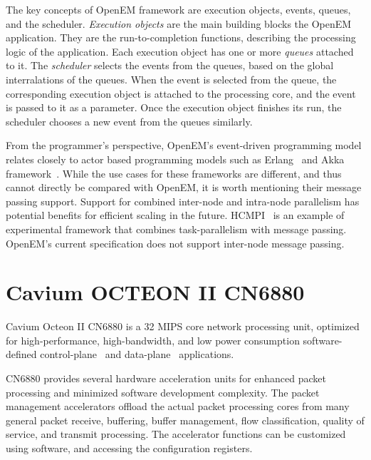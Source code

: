 The key concepts of OpenEM framework are execution objects, events, queues, and the scheduler. \emph{Execution objects} are the main building blocks the OpenEM application. They are the run-to-completion functions, describing the processing logic of the application. Each execution object has one or more \emph{queues} attached to it. The \emph{scheduler} selects the events from the queues, based on the global interralations of the queues. When the event is selected from the queue, the corresponding execution object is attached to the processing core, and the event is passed to it as a parameter. Once the execution object finishes its run, the scheduler chooses a new event from the queues similarly.

From the programmer's perspective, OpenEM's event-driven programming model relates closely to actor based programming models such as Erlang~\cite{Armstrong:1993:Concurrent} and Akka framework~\cite{Akka}. While the use cases for these frameworks are different, and thus cannot directly be compared with OpenEM, it is worth mentioning their message passing support. Support for combined inter-node and intra-node parallelism has potential benefits for efficient scaling in the future. HCMPI~\cite{Chatterjee:2013:HCMPI} is an example of experimental framework that combines task-parallelism with message passing. OpenEM's current specification does not support inter-node message passing.

\section{Cavium OCTEON II CN6880}
\label{sec:cavium-octeon}

Cavium Octeon II CN6880 is a 32 MIPS core network processing unit, optimized for high-performance, high-bandwidth, and low power consumption software-defined control-plane~\cite{control-plane} and data-plane~\cite{data-plane} applications.

CN6880 provides several hardware acceleration units for enhanced packet processing and minimized software development complexity. The packet management accelerators offload the actual packet processing cores from many general packet receive, buffering, buffer management, flow classification, quality of service, and transmit processing. The accelerator functions can be customized using software, and accessing the configuration registers.~\cite{cavium:2010:fundamentals}

